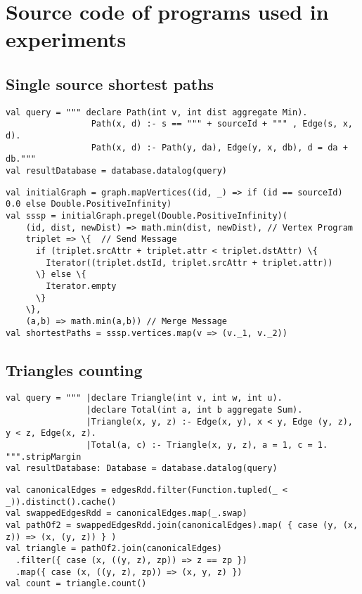 \chapter{Source code of programs used in experiments}

\section{Single source shortest paths}
\begin{Verbatim}[label=Shortest paths - SparkDatalog]
val query = """ declare Path(int v, int dist aggregate Min).
                 Path(x, d) :- s == """ + sourceId + """ , Edge(s, x, d).
                 Path(x, d) :- Path(y, da), Edge(y, x, db), d = da + db."""
val resultDatabase = database.datalog(query)
\end{Verbatim}

\vspace{0cm}

\begin{Verbatim}[label=Shortest paths - Spark]
val initialGraph = graph.mapVertices((id, _) => if (id == sourceId) 0.0 else Double.PositiveInfinity)
val sssp = initialGraph.pregel(Double.PositiveInfinity)(
    (id, dist, newDist) => math.min(dist, newDist), // Vertex Program
    triplet => \{  // Send Message
      if (triplet.srcAttr + triplet.attr < triplet.dstAttr) \{
        Iterator((triplet.dstId, triplet.srcAttr + triplet.attr))
      \} else \{
        Iterator.empty
      \}
    \},
    (a,b) => math.min(a,b)) // Merge Message
val shortestPaths = sssp.vertices.map(v => (v._1, v._2))
\end{Verbatim}


\section{Triangles counting}
\begin{Verbatim}[label=Triangles counting - SparkDatalog]
val query = """ |declare Triangle(int v, int w, int u).
                |declare Total(int a, int b aggregate Sum).
                |Triangle(x, y, z) :- Edge(x, y), x < y, Edge (y, z), y < z, Edge(x, z).
                |Total(a, c) :- Triangle(x, y, z), a = 1, c = 1. """.stripMargin
val resultDatabase: Database = database.datalog(query)
\end{Verbatim}

\vspace{0cm}

\begin{Verbatim}[label=Triangles counting - Spark]
val canonicalEdges = edgesRdd.filter(Function.tupled(_ < _)).distinct().cache()
val swappedEdgesRdd = canonicalEdges.map(_.swap)
val pathOf2 = swappedEdgesRdd.join(canonicalEdges).map( { case (y, (x, z)) => (x, (y, z)) } )
val triangle = pathOf2.join(canonicalEdges)
  .filter({ case (x, ((y, z), zp)) => z == zp })
  .map({ case (x, ((y, z), zp)) => (x, y, z) })
val count = triangle.count()
\end{Verbatim}


